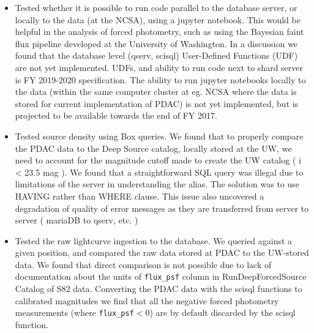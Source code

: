 \documentclass[fleqn,usenatbib, onecolumn]{mnras} %
\begin{document}
\begin{itemize}
	\item Tested whether it is possible to run code parallel to the database server,  or locally to the data (at the NCSA), using a jupyter notebook.  This would be helpful in the analysis of forced photometry, such as using the Bayesian faint flux pipeline developed at the University of Washington. In a discussion we found that the database level (qserv, scisql) User-Defined Functions (UDF) are not yet implemented. UDFs, and ability to run code next to shard server is  FY  2019-2020 specification.  The ability to run jupyter notebooks locally to the data (within the same computer cluster at eg. NCSA where the data is stored for current implementation of PDAC) is not yet implemented, but is projected to be available towards the end of FY 2017.

	\item  Tested source density using Box queries. We found that to properly compare the PDAC data to the Deep Source catalog, locally stored at the UW, we need to account for the magnitude cutoff made to create the UW catalog ( i < 23.5 mag ). We found that a straightforward SQL query was illegal due to limitations of the server in understanding the alias. The solution was to use HAVING rather than WHERE clause. This issue also uncovered a degradation of quality of error messages as they are transferred from server to server ( mariaDB to qserv, etc. )

    \item  Tested the raw lightcurve ingestion to the database. We queried against a given position, and compared the raw data stored at PDAC to the UW-stored data.  We found that direct comparison is not possible due to lack of documentation about the units of \verb|flux_psf| column in RunDeepForcedSource Catalog of S82 data. Converting the PDAC data with the scisql  functions to calibrated magnitudes we find that all the negative forced photometry measurements  (where \verb|flux_psf|$<0$) are by default discarded by the scisql function. 


 \end{itemize}   








\bsp	%
\label{lastpage}
\end{document}
